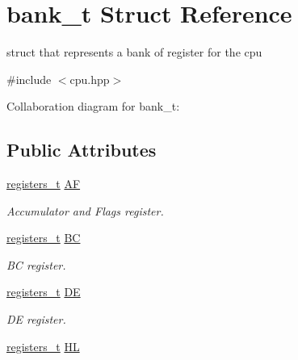 \hypertarget{structbank__t}{}\section{bank\+\_\+t Struct Reference}
\label{structbank__t}


struct that represents a bank of register for the cpu  




{\ttfamily \#include $<$cpu.\+hpp$>$}



Collaboration diagram for bank\+\_\+t\+:
\subsection*{Public Attributes}
\begin{DoxyCompactItemize}
\item 
\hyperlink{unionregisters__t}{registers\+\_\+t} \hyperlink{structbank__t_a1a6e2e5b9938496ae9bb6972558ff81e}{AF}\hypertarget{structbank__t_a1a6e2e5b9938496ae9bb6972558ff81e}{}\label{structbank__t_a1a6e2e5b9938496ae9bb6972558ff81e}

\begin{DoxyCompactList}\small\item\em Accumulator and Flags register. \end{DoxyCompactList}\item 
\hyperlink{unionregisters__t}{registers\+\_\+t} \hyperlink{structbank__t_a246f7cef121dd1d7a2539923e966218c}{BC}\hypertarget{structbank__t_a246f7cef121dd1d7a2539923e966218c}{}\label{structbank__t_a246f7cef121dd1d7a2539923e966218c}

\begin{DoxyCompactList}\small\item\em BC register. \end{DoxyCompactList}\item 
\hyperlink{unionregisters__t}{registers\+\_\+t} \hyperlink{structbank__t_af634e1ee0e7648b96d3d458e94475b7b}{DE}\hypertarget{structbank__t_af634e1ee0e7648b96d3d458e94475b7b}{}\label{structbank__t_af634e1ee0e7648b96d3d458e94475b7b}

\begin{DoxyCompactList}\small\item\em DE register. \end{DoxyCompactList}\item 
\hyperlink{unionregisters__t}{registers\+\_\+t} \hyperlink{structbank__t_a21303316d2dba0883a8c418a80229297}{HL}\hypertarget{structbank__t_a21303316d2dba0883a8c418a80229297}{}\label{structbank__t_a21303316d2dba0883a8c418a80229297}


\end{DoxyCompactItemize}
